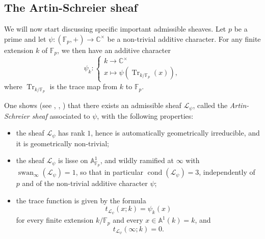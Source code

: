 \documentclass[12pt,a4paper,reqno]{amsart}
\numberwithin{equation}{section}
\DeclareMathOperator\swan{swan}
\DeclareMathOperator*\cond{cond}
\theoremstyle{plain}
\theoremstyle{definition}
\newcommand\F{\mathbb{F}}
\newcommand\C{\mathbb{C}}
\newcommand\mcL{\mathcal{L}}
\DeclareMathOperator{\Tr}{Tr}
\newcommand\Fp{\F_{p}}
\begin{document}
\subsection{The Artin-Schreier sheaf}

We will now start discussing specific important admissible sheaves.
Let $p$ be a prime and let $\psi\colon (\Fp,+)\rightarrow \C^\times$
be a non-trivial additive character.  For any finite extension $k$ of
$\Fp$, we then have an additive character
$$
\psi_k \colon \begin{cases}
  k  \to \C^\times\\
  x\mapsto \psi(\Tr_{k/\Fp}(x)),
\end{cases}
$$
where $\Tr_{k/\Fp}$ is the trace map from $k$ to $\Fp$.
\par
One shows (see \cite[Chap.\ 4]{GKM}, \cite[\S 1.4]{deligne41/2},
\cite[p.\ 302--303]{ik}) that there exists an admissible sheaf
$\mcL_{\psi}$, called the \emph{Artin-Schreier sheaf} associated to
$\psi$, with the following properties:
\begin{itemize}
\item the sheaf $\mcL_{\psi}$ has rank $1$, hence is automatically
  geometrically irreducible, and it is geometrically non-trivial;
\item the sheaf $\mcL_{\psi}$ is lisse on $\mathbb{A}^1_{\Fp}$, and
  wildly ramified at $\infty$ with $\swan_\infty(\mcL_\psi)=1$, so
  that in particular $\cond(\mcL_{\psi})=3$, independently of $p$ and
  of the non-trivial additive character $\psi$;
\item the trace function is given by the formula
$$
t_{\mcL_\psi}(x;k)=\psi_{k}(x)
$$
for every finite extension $k/\Fp$ and every $x\in \mathbb{A}^1(k)=k$,
and
$$
t_{\mcL_{\psi}}(\infty;k)=0.
$$
\end{itemize}
\end{document}
